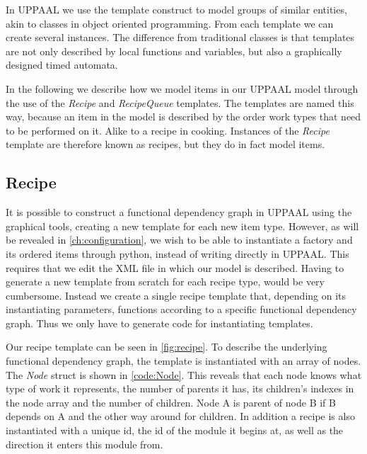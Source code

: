 In UPPAAL we use the template construct to model groups of similar entities, akin to classes in object oriented programming. From each template we can create several instances. The difference from traditional classes is that templates are not only described by local functions and variables, but also a graphically designed timed automata. 

In the following we describe how we model items in our UPPAAL model through the use of the \emph{Recipe} and \emph{RecipeQueue} templates. The templates are named this way, because an item in the model is described by the order work types that need to be performed on it. Alike to a recipe in cooking. Instances of the \emph{Recipe} template are therefore known as recipes, but they do in fact model items.  

\subsection{Recipe}\label{subs:recipe}
It is possible to construct a functional dependency graph in UPPAAL using the graphical tools, creating a new template for each new item type. However, as will be revealed in \cref{ch:configuration}, we wish to be able to instantiate a factory and its ordered items through python, instead of writing directly in UPPAAL. This requires that we edit the XML file in which our model is described. Having to generate a new template from scratch for each recipe type, would be very cumbersome. Instead we create a single recipe template that, depending on its instantiating parameters, functions according to a specific functional dependency graph. Thus we only have to generate code for instantiating templates.

Our recipe template can be seen in \cref{fig:recipe}. To describe the underlying functional dependency graph, the template is instantiated with an array of nodes. The \emph{Node} struct is shown in \cref{code:Node}. This reveals that each node knows what type of work it represents, the number of parents it has, its children's indexes in the node array and the number of children. Node A is parent of node B if B depends on A and the other way around for children. In addition a recipe is also instantiated with a unique id, the id of the module it begins at, as well as the direction it enters this module from. 



